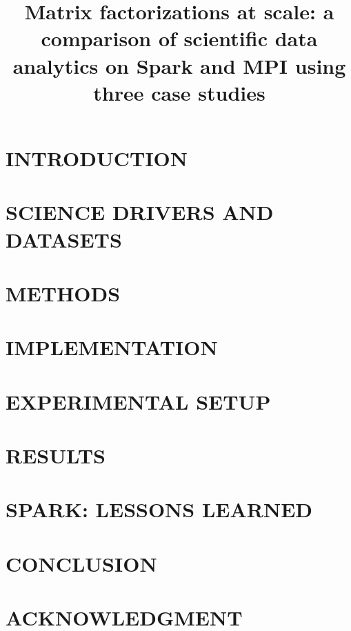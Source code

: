 \documentclass[letterpaper, 10 pt, conference]{ieeeconf}  %
\title{\LARGE \bf
Matrix factorizations at scale: a comparison of scientific data analytics on Spark and MPI using three case studies 
}
\begin{document}
\maketitle
\thispagestyle{empty}
\pagestyle{empty}



\section{INTRODUCTION}
\label{sec:introduction}


\section{SCIENCE DRIVERS AND DATASETS}
\label{sec:science}


\section{METHODS}
\label{sec:methods}


\section{IMPLEMENTATION}
\label{sec:implementation}


\section{EXPERIMENTAL SETUP}
\label{sec:setup}


\section{RESULTS}
\label{sec:results}


\section{SPARK: LESSONS LEARNED}
\label{sec:lessons}


\section{CONCLUSION}
\label{sec:conclusions}


\addtolength{\textheight}{-12cm}   

\section*{ACKNOWLEDGMENT}


\nocite{*}


\end{document}
